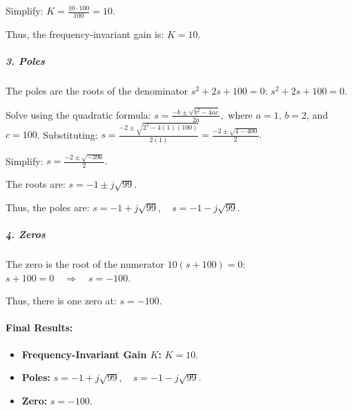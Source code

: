 \documentclass[11pt]{article}
\begin{document}
Simplify: \(K = \frac{10 \cdot 100}{100} = 10.\)

Thus, the frequency-invariant gain is: \(K = 10.\)

\subparagraph{\texorpdfstring{3. \textbf{Poles}}{3. Poles}}\label{poles}

The poles are the roots of the denominator \(s^2 + 2s + 100 = 0\):
\(s^2 + 2s + 100 = 0.\)

Solve using the quadratic formula:
\(s = \frac{-b \pm \sqrt{b^2 - 4ac}}{2a},\) where \(a = 1\), \(b = 2\),
and \(c = 100\). Substituting:
\(s = \frac{-2 \pm \sqrt{2^2 - 4(1)(100)}}{2(1)} = \frac{-2 \pm \sqrt{4 - 400}}{2}.\)

Simplify: \(s = \frac{-2 \pm \sqrt{-396}}{2}.\)

The roots are: \(s = -1 \pm j\sqrt{99}.\)

Thus, the poles are: \(s = -1 + j\sqrt{99}, \quad s = -1 - j\sqrt{99}.\)

\subparagraph{\texorpdfstring{4. \textbf{Zeros}}{4. Zeros}}\label{zeros}

The zero is the root of the numerator \(10(s + 100) = 0\):
\(s + 100 = 0 \quad \Rightarrow \quad s = -100.\)

Thus, there is one zero at: \(s = -100.\)

\paragraph{Final Results:}\label{final-results}

\begin{itemize}
\item
  \textbf{Frequency-Invariant Gain \(K\):} \(K = 10.\)
\item
  \textbf{Poles:} \(s = -1 + j\sqrt{99}, \quad s = -1 - j\sqrt{99}.\)
\item
  \textbf{Zero:} \(s = -100.\)
\end{itemize}
\end{document}
